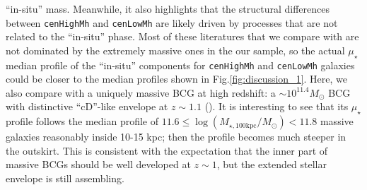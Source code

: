 \documentclass{emulateapj}
\def\rbcg{\texttt{cenHighMh}}
\def\nbcg{\texttt{cenLowMh}}
\def\logmtot{{$\log (M_{\star,100\mathrm{kpc}}/M_{\odot})$}}
\def\mden{{$\mu_{\star}$}}
\newcommand{\update}[1]{\textcolor{Bittersweet}{#1}}
\begin{document}
\begin{CJK*}{UTF8}{gbsn}
    ``in-situ'' mass.  Meanwhile, it also highlights that the structural differences 
    between \rbcg{} and \nbcg{} are likely driven by processes that are not related 
    to the ``in-situ'' phase. 
    \update{
    Most of these literatures that we compare with are not dominated by the extremely 
    massive ones in the our sample, so the actual \mden{} median profile of the ``in-situ'' 
    components for \rbcg{} and \nbcg{} galaxies could be closer to the median profiles 
    shown in Fig.\ref{fig:discussion_1}.
    }
    Here, we also compare with a uniquely massive BCG at high redshift: 
    a $\sim 10^{11.4} M_{\odot}$ BCG with distinctive ``cD''-like envelope at $z\sim 1.1$ 
    (\citealt{Liu2013}).  
    It is interesting to see that its \mden{} profile follows the median profile of 
    $11.6\leq$\logmtot{}$<11.8$ massive galaxies reasonably inside 10-15 kpc; 
    then the profile becomes much steeper in the outskirt.  
    This is consistent with the expectation that the inner part of massive BCGs should 
    be well developed at $z\sim 1$, but the extended stellar envelope is still assembling.  


\end{CJK*}
\end{document}
